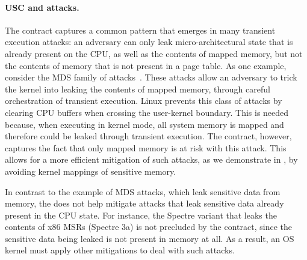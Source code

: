 
\paragraph{USC and attacks.}

The contract captures a common pattern that emerges in many transient
execution attacks: an adversary can only leak micro-architectural
state that is already present on the CPU, as well as the contents
of mapped memory, but not the contents of memory that is not
present in a page table.  As one example, consider the MDS family
of attacks~\cite{canella:fallout, schwarz:zombieload,schaik:ridl}.
These attacks allow an adversary to trick the kernel into leaking the
contents of mapped memory, through careful orchestration of transient
execution.  Linux prevents this class of attacks by clearing CPU buffers
when crossing the user-kernel boundary.  This is needed because, when
executing in kernel mode, all system memory is mapped and therefore
could be leaked through transient execution.  The contract, however,
captures the fact that only mapped memory is at risk with this attack.
This allows for a more efficient mitigation of such attacks, as we
demonstrate in \sys, by avoiding kernel mappings of sensitive memory.

In contrast to the example of MDS attacks, which leak sensitive data
from memory, the \contract{} does not help mitigate attacks that leak
sensitive data already present in the CPU state.  For instance, the
Spectre variant that leaks the contents of x86 MSRs (Spectre 3a) is not
precluded by the contract, since the sensitive data being leaked is not
present in memory at all.  As a result, an OS kernel must apply other
mitigations to deal with such attacks.

